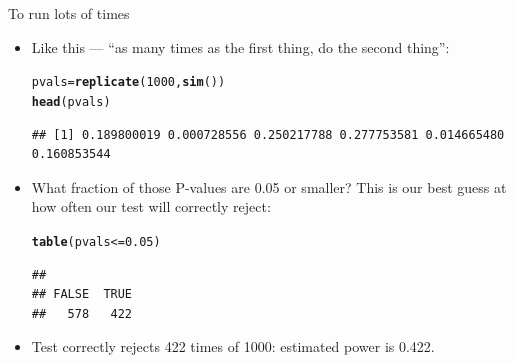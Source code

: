 \documentclass[unknownkeysallowed]{beamer}\usepackage[]{graphicx}\usepackage[]{color}
\makeatletter
\newcommand{\hlnum}[1]{\textcolor[rgb]{0.686,0.059,0.569}{#1}}%
\newcommand{\hlopt}[1]{\textcolor[rgb]{0,0,0}{#1}}%
\newcommand{\hlstd}[1]{\textcolor[rgb]{0.345,0.345,0.345}{#1}}%
\newcommand{\hlkwb}[1]{\textcolor[rgb]{0.69,0.353,0.396}{#1}}%
\newcommand{\hlkwd}[1]{\textcolor[rgb]{0.737,0.353,0.396}{\textbf{#1}}}%
\newenvironment{kframe}{%
 \def\at@end@of@kframe{}%
 \ifinner\ifhmode%
  \def\at@end@of@kframe{\end{minipage}}%
  \begin{minipage}{\columnwidth}%
 \fi\fi%
 \def\FrameCommand##1{\hskip\@totalleftmargin \hskip-\fboxsep
 \colorbox{shadecolor}{##1}\hskip-\fboxsep
     \hskip-\linewidth \hskip-\@totalleftmargin \hskip\columnwidth}%
 \MakeFramed {\advance\hsize-\width
   \@totalleftmargin\z@ \linewidth\hsize
   \@setminipage}}%
 {\par\unskip\endMakeFramed%
 \at@end@of@kframe}
\newenvironment{knitrout}{}{} %
\makeatother
\begin{document}
\begin{frame}[fragile]{To run lots of times}
  
  \begin{itemize}
  \item Like this --- ``as many times as the first thing, do the second thing'':
\begin{knitrout}
\color{fgcolor}\begin{kframe}
\begin{alltt}
\hlstd{pvals}\hlkwb{=}\hlkwd{replicate}\hlstd{(}\hlnum{1000}\hlstd{,}\hlkwd{sim}\hlstd{())}
\hlkwd{head}\hlstd{(pvals)}
\end{alltt}
\begin{verbatim}
## [1] 0.189800019 0.000728556 0.250217788 0.277753581 0.014665480 0.160853544
\end{verbatim}
\end{kframe}
\end{knitrout}
\item What fraction of those P-values are 0.05 or smaller? This is our
  best guess at how often our test will correctly reject:
  
\begin{knitrout}
\color{fgcolor}\begin{kframe}
\begin{alltt}
\hlkwd{table}\hlstd{(pvals}\hlopt{<=}\hlnum{0.05}\hlstd{)}
\end{alltt}
\begin{verbatim}
## 
## FALSE  TRUE 
##   578   422
\end{verbatim}
\end{kframe}
\end{knitrout}

\item Test correctly rejects 422 times of 1000: estimated power is 0.422.
  \end{itemize}
  
\end{frame}
\end{document}
